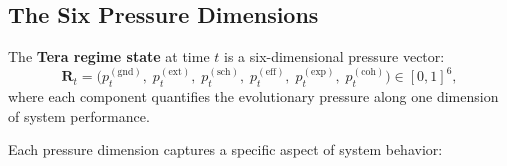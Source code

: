 \subsection{The Six Pressure Dimensions}

\begin{dogmadef}
The \textbf{Tera regime state} at time $t$ is a six-dimensional pressure vector:
\begin{equation}
\mathbf{R}_t = \bigl(p_t^{(\text{gnd})},\; p_t^{(\text{ext})},\; p_t^{(\text{sch})},\; p_t^{(\text{eff})},\; p_t^{(\text{exp})},\; p_t^{(\text{coh})}\bigr) \in [0, 1]^6,
\label{eq:regime-vector}
\end{equation}
where each component quantifies the evolutionary pressure along one dimension of system performance.
\end{dogmadef}

Each pressure dimension captures a specific aspect of system behavior:

